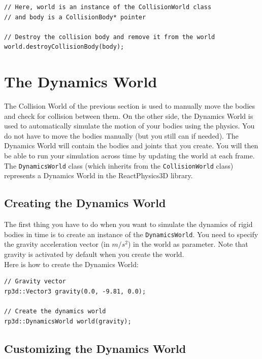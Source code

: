 \documentclass[a4paper,12pt]{article}
\begin{document}
    \begin{lstlisting}
// Here, world is an instance of the CollisionWorld class
// and body is a CollisionBody* pointer

// Destroy the collision body and remove it from the world
world.destroyCollisionBody(body);
  \end{lstlisting}

    \section{The Dynamics World}
    \label{sec:dynamicsworld}

    The Collision World of the previous section is used to manually move the bodies and check for collision between them. On the other side, the Dynamics World
    is used to automatically simulate the motion of your bodies using the physics. You do not have to move the bodies manually (but you still can if needed).
    The Dynamics World will contain the bodies and joints that you create. You will then be able to run your simulation across time by updating the world at each frame.
    The \texttt{DynamicsWorld} class (which inherits from the \texttt{CollisionWorld} class) represents a Dynamics World in the ReactPhysics3D library.

    \subsection{Creating the Dynamics World}

    The first thing you have to do when you want to simulate the dynamics of rigid bodies in time is to create an instance
    of the \texttt{DynamicsWorld}. You need to specify the gravity acceleration vector (in $m / s^2$) in the world as parameter. Note that gravity is
    activated by default when you create the world. \\

    Here is how to create the Dynamics World: \\

    \begin{lstlisting}
// Gravity vector
rp3d::Vector3 gravity(0.0, -9.81, 0.0);

// Create the dynamics world
rp3d::DynamicsWorld world(gravity);
  \end{lstlisting}

    \subsection{Customizing the Dynamics World}
\end{document}
